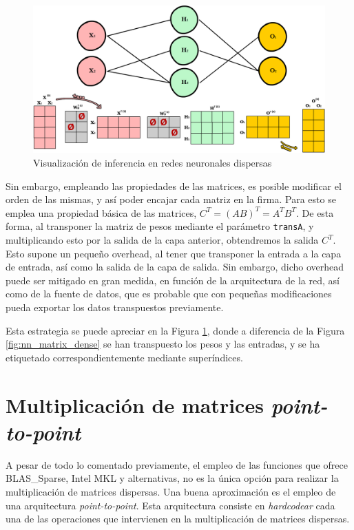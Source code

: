 \begin{figure}[h!]
    \centering
    \includegraphics[width=\textwidth]{img/neural_network_matrix_sparse/neural_network_matrix_sparse.png}
    \caption{Visualización de inferencia en redes neuronales dispersas}
    \label{fig:nn_matrix_sparse}
\end{figure}

Sin embargo, empleando las propiedades de las matrices, es posible modificar el orden de las mismas, y así poder encajar cada matriz en la firma. Para esto se emplea una propiedad básica de las matrices, $C^{T} = (AB)^{T} = A^{T}B^{T}$. De esta forma, al transponer la matriz de pesos mediante el parámetro \texttt{transA}, y multiplicando esto por la salida de la capa anterior, obtendremos la salida $C^{T}$. Esto supone un pequeño overhead, al tener que transponer la entrada a la capa de entrada, así como la salida de la capa de salida. Sin embargo, dicho overhead puede ser mitigado en gran medida, en función de la arquitectura de la red, así como de la fuente de datos, que es probable que con pequeñas modificaciones pueda exportar los datos transpuestos previamente.

Esta estrategia se puede apreciar en la Figura \ref{fig:nn_matrix_sparse}, donde a diferencia de la Figura \ref{fig:nn_matrix_dense} se han transpuesto los pesos y las entradas, y se ha etiquetado correspondientemente mediante superíndices.

\section{Multiplicación de matrices \textit{point-to-point}}
\label{sec:multiplicacion_point_to_point}
A pesar de todo lo comentado previamente, el empleo de las funciones que ofrece BLAS\_Sparse, Intel MKL y alternativas, no es la única opción para realizar la multiplicación de matrices dispersas. Una buena aproximación es el empleo de una arquitectura \textit{point-to-point}. Esta arquitectura consiste en \textit{hardcodear} cada una de las operaciones que intervienen en la multiplicación de matrices dispersas.

